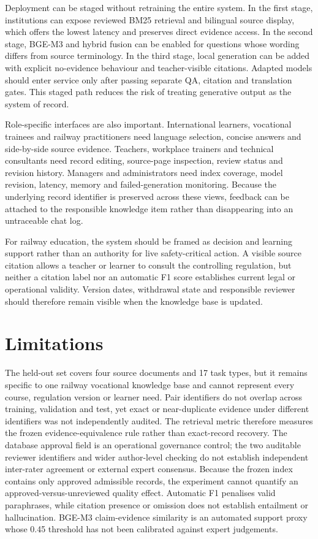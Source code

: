 Deployment can be staged without retraining the entire system. In the first stage, institutions can expose reviewed BM25 retrieval and bilingual source display, which offers the lowest latency and preserves direct evidence access. In the second stage, BGE-M3 and hybrid fusion can be enabled for questions whose wording differs from source terminology. In the third stage, local generation can be added with explicit no-evidence behaviour and teacher-visible citations. Adapted models should enter service only after passing separate QA, citation and translation gates. This staged path reduces the risk of treating generative output as the system of record.

Role-specific interfaces are also important. International learners, vocational trainees and railway practitioners need language selection, concise answers and side-by-side source evidence. Teachers, workplace trainers and technical consultants need record editing, source-page inspection, review status and revision history. Managers and administrators need index coverage, model revision, latency, memory and failed-generation monitoring. Because the underlying record identifier is preserved across these views, feedback can be attached to the responsible knowledge item rather than disappearing into an untraceable chat log.

For railway education, the system should be framed as decision and learning support rather than an authority for live safety-critical action. A visible source citation allows a teacher or learner to consult the controlling regulation, but neither a citation label nor an automatic F1 score establishes current legal or operational validity. Version dates, withdrawal state and responsible reviewer should therefore remain visible when the knowledge base is updated.

\section{Limitations}

The held-out set covers four source documents and 17 task types, but it remains specific to one railway vocational knowledge base and cannot represent every course, regulation version or learner need. Pair identifiers do not overlap across training, validation and test, yet exact or near-duplicate evidence under different identifiers was not independently audited. The retrieval metric therefore measures the frozen evidence-equivalence rule rather than exact-record recovery. The database approval field is an operational governance control; the two auditable reviewer identifiers and wider author-level checking do not establish independent inter-rater agreement or external expert consensus. Because the frozen index contains only approved admissible records, the experiment cannot quantify an approved-versus-unreviewed quality effect. Automatic F1 penalises valid paraphrases, while citation presence or omission does not establish entailment or hallucination. BGE-M3 claim-evidence similarity is an automated support proxy whose 0.45 threshold has not been calibrated against expert judgements.

